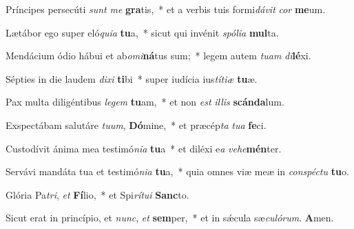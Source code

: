 \item Príncipes persecúti \textit{sunt} \textit{me} \textbf{gra}tis,~* et a verbis tuis formi\textit{dávit} \textit{cor} \textbf{me}um.

\item Lætábor ego super eló\textit{quia} \textbf{tu}a,~* sicut qui invénit \textit{spólia} \textbf{mul}ta.

\item Mendácium ódio hábui et ab\textit{omi}\textbf{ná}tus sum;~* legem autem \textit{tuam} \textit{di}\textbf{lé}xi.

\item Sépties in die laudem \textit{dixi} \textbf{ti}bi~* super iudícia ius\textit{títiæ} \textbf{tu}æ.

\item Pax multa diligéntibus \textit{legem} \textbf{tu}am,~* et non \textit{est} \textit{illis} \textbf{scán}\textbf{da}lum.

\item Exspectábam salutáre \textit{tuum}, \textbf{Dó}mine,~* et præcép\textit{ta} \textit{tua} \textbf{fe}ci.

\item Custodívit ánima mea testimó\textit{nia} \textbf{tu}a~* et diléxi e\textit{a} \textit{vehe}\textbf{mén}ter.

\item Servávi mandáta tua et testimó\textit{nia} \textbf{tu}a,~* quia omnes viæ meæ in \textit{conspéctu} \textbf{tu}o.

\item Glória Pa\textit{tri}, \textit{et} \textbf{Fí}lio,~* et Spi\textit{rítui} \textbf{Sanc}to.

\item Sicut erat in princípio, et \textit{nunc}, \textit{et} \textbf{sem}per,~* et in sǽcula sæ\textit{culórum}. \textbf{A}men.